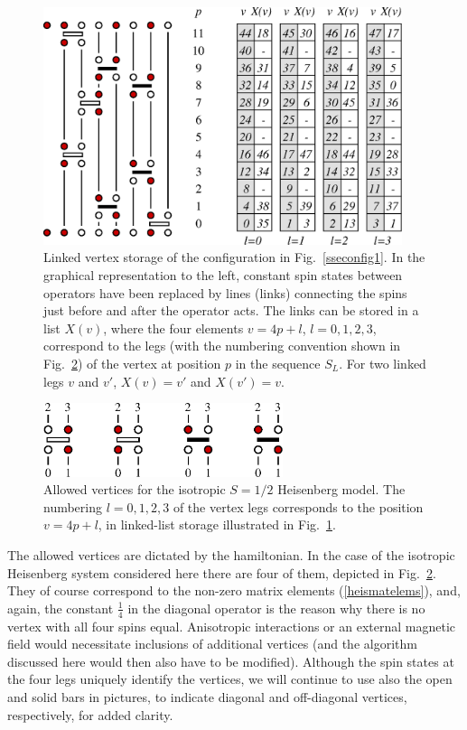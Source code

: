 \documentclass[draft,numberedheadings]{aipproc}
\begin{document}
\begin{figure}
\includegraphics[width=10.5cm]{sseconfig2.eps}
\caption{Linked vertex storage of the configuration in Fig.~\ref{sseconfig1}. In the graphical representation to the left, 
constant spin states between operators have been replaced by lines (links) connecting the spins just before and after the operator acts. The links 
can be stored in a list $X(v)$, where the four elements $v=4p+l$, $l=0,1,2,3$, correspond to the legs (with the numbering convention shown in 
Fig.~\ref{vertexlegs}) of the vertex at position $p$ in the sequence $S_L$. For two linked legs $v$ and $v'$, $X(v)=v'$ and $X(v')=v$.}
\label{sseconfig2}
\end{figure}

\begin{figure}
\includegraphics[width=7cm]{vertexlegs.eps}
\caption{Allowed vertices for the isotropic $S=1/2$ Heisenberg model. The numbering $l=0,1,2,3$ of the vertex legs corresponds to the position $v=4p+l$,
in linked-list storage illustrated in Fig.~\ref{sseconfig2}.}
\label{vertexlegs}
\end{figure}

The allowed vertices are dictated by the hamiltonian. In the case of the isotropic Heisenberg system considered here there are four of them, depicted in 
Fig.~\ref{vertexlegs}. They of course correspond to the non-zero matrix elements (\ref{heismatelems}), and, again, the constant $\frac{1}{4}$ in the diagonal
operator is the reason why there is no vertex with all four spins equal. Anisotropic interactions or an external magnetic field would necessitate inclusions 
of additional vertices \cite{sandvik99a,syljuasen02} (and the algorithm discussed here would then also have to be modified). Although the spin states at the four 
legs uniquely identify the vertices, we will continue to use also the open and solid bars in pictures, to indicate diagonal and off-diagonal vertices, respectively, 
for added clarity.
\end{document}
